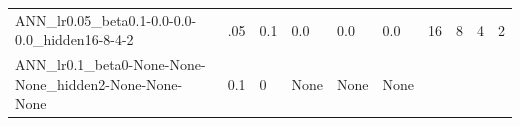 \documentclass[11pt, a4paper , landscape]{article}
\begin{document}
\begin{longtable}[]{@{}llllllllll@{}}
\begin{minipage}[t]{0.04\columnwidth}
ANN\_lr0.05\_beta0.1-0.0-0.0-0.0\_hidden16-8-4-2\strut
\end{minipage} & \begin{minipage}[t]{0.09\columnwidth}\raggedright\strut
.05\strut
\end{minipage} & \begin{minipage}[t]{0.04\columnwidth}\raggedright\strut
0.1\strut
\end{minipage} & \begin{minipage}[t]{0.05\columnwidth}\raggedright\strut
0.0\strut
\end{minipage} & \begin{minipage}[t]{0.05\columnwidth}\raggedright\strut
0.0\strut
\end{minipage} & \begin{minipage}[t]{0.05\columnwidth}\raggedright\strut
0.0\strut
\end{minipage} & \begin{minipage}[t]{0.10\columnwidth}\raggedright\strut
16\strut
\end{minipage} & \begin{minipage}[t]{0.10\columnwidth}\raggedright\strut
8\strut
\end{minipage} & \begin{minipage}[t]{0.09\columnwidth}\raggedright\strut
4\strut
\end{minipage} & \begin{minipage}[t]{0.11\columnwidth}\raggedright\strut
2\strut
\end{minipage}\tabularnewline
\begin{minipage}[t]{0.04\columnwidth}\raggedright\strut
ANN\_lr0.1\_beta0-None-None-None\_hidden2-None-None-None\strut
\end{minipage} & \begin{minipage}[t]{0.09\columnwidth}\raggedright\strut
0.1\strut
\end{minipage} & \begin{minipage}[t]{0.04\columnwidth}\raggedright\strut
0\strut
\end{minipage} & \begin{minipage}[t]{0.05\columnwidth}\raggedright\strut
None\strut
\end{minipage} & \begin{minipage}[t]{0.05\columnwidth}\raggedright\strut
None\strut
\end{minipage} & \begin{minipage}[t]{0.05\columnwidth}\raggedright\strut
None\strut
\end{minipage} & \begin{minipage}[t]{0.10\columnwidth}\raggedright\strut

\end{minipage}
\end{longtable}
\end{document}
